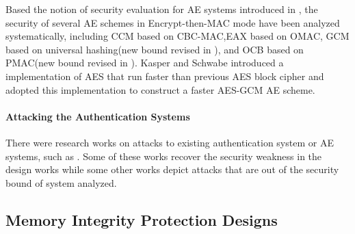 \documentclass{article}
\begin{document}
Based the notion of security evaluation for AE systems introduced in \cite{aead}, the security of several AE schemes in
Encrypt-then-MAC mode have been analyzed systematically, including CCM \cite{ccm}based on
CBC-MAC,EAX\cite{eax} based on OMAC, GCM
\cite{gcm} based on universal hashing(new bound revised in \cite{breaking}), and
OCB\cite{ocb} based on PMAC(new bound revised in \cite{tweak_pmac,iPMAC}). Kasper and
Schwabe introduced a implementation of AES that run faster than previous AES block cipher
and adopted this implementation to construct a faster AES-GCM AE
scheme\cite{fast}.

\paragraph{Attacking the Authentication Systems}
There were research works on attacks to existing authentication system or AE systems, such as
\cite{cycle,attack_blk,hardware_attack}. Some of these works recover the security weakness in the design works while some other works depict attacks that are out of the security bound of system analyzed. 

\subsection{Memory Integrity Protection Designs}
\end{document}
